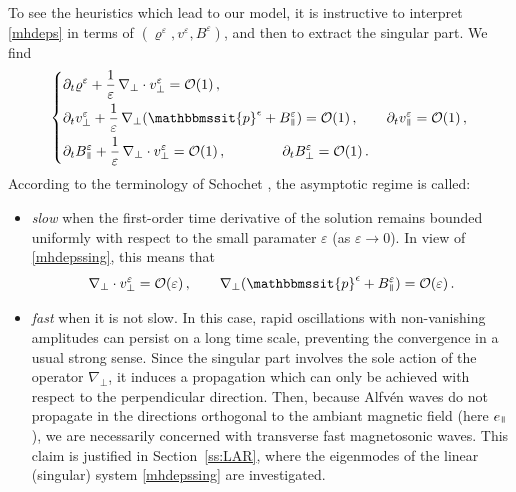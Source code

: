 \documentclass[11pt,reqno]{amsart}
\newcommand{\myparallel}{{\mkern3mu\vphantom{\perp}\vrule depth 0pt\mkern2mu\vrule depth 0pt\mkern3mu}}
\begin{document}
To see the heuristics which lead to our model, it is instructive to interpret \eqref{mhdeps} in terms of $ (\varrho^\varepsilon, v^\varepsilon , B^\varepsilon ) $, and then to extract the singular part. We find 
\begin{equation}
\left \{
\begin{aligned}
&\partial_t \varrho^\varepsilon + \frac{1}{\varepsilon} \, \nabla_\perp  \cdot v^\varepsilon_\perp = \mathcal{O}(1) \,, \\
&\partial_t v^\varepsilon_\perp + \frac{1}{\varepsilon} \, \nabla_\perp ( \mathbbmssit{p}^\epsilon + B^\varepsilon_\myparallel) = \mathcal{O}(1) \,, \qquad \partial_t v^\varepsilon_\myparallel = \mathcal{O}(1) \,,\\
&\partial_t B^\varepsilon_\myparallel + \frac{1}{\varepsilon} \,  \nabla_\perp \cdot v_\perp^\varepsilon = \mathcal{O}(1) \,, \qquad \qquad \partial_t B^\varepsilon_\perp = \mathcal{O}(1)\, .
\end{aligned}
\right.
\label{mhdepssing}
\end{equation}
According  to the terminology of Schochet \cite{Sch94}, the asymptotic regime is called:
\begin{itemize}
 \item {\it slow}  when the first-order time derivative of the solution remains bounded uniformly with respect to the small paramater $\varepsilon $ (as $\varepsilon \rightarrow 0$). In view of \eqref{mhdepssing}, this means that
 \begin{equation}
\nabla_\perp  \cdot v^\varepsilon_\perp = \mathcal{O}(\varepsilon) \,, \qquad \nabla_\perp ( \mathbbmssit{p}^\epsilon + B^\varepsilon_\myparallel) = \mathcal{O}(\varepsilon) \, .
\label{slowprep}
\end{equation}
\item {\it fast} when it is not slow. In this case, rapid  oscillations with non-vanishing amplitudes can persist on a long time scale, preventing the convergence in a usual strong sense.
Since the singular part involves the sole action of the operator $ \nabla_\perp $, it induces a propagation which can only be achieved with respect to the perpendicular direction. Then, because  Alfv\'en waves do not propagate in the directions orthogonal to the ambiant magnetic field (here $ e_\myparallel $), we are necessarily concerned with transverse fast magnetosonic waves. This claim is justified in Section~\ref{ss:LAR}, where the eigenmodes of the linear (singular) system \eqref{mhdepssing} are investigated.
\end{itemize}
\end{document}
